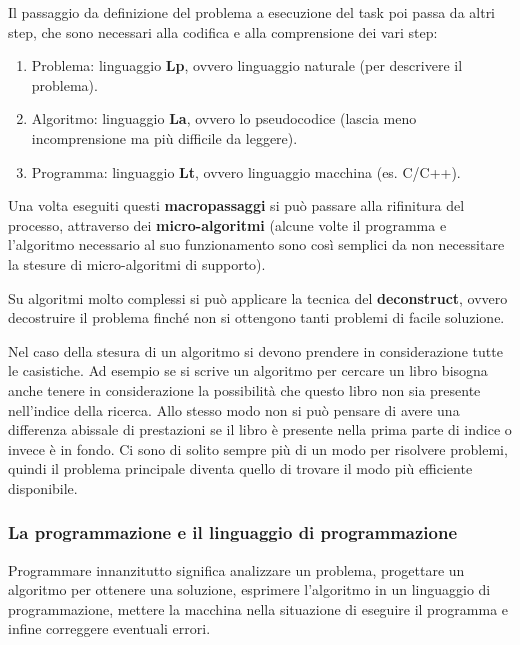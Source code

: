 \documentclass[
  paper=a4,
  oneside  ,captions=tableheading
]{scrbook}
\providecommand{\tightlist}{%
  \setlength{\itemsep}{0pt}\setlength{\parskip}{0pt}}
\begin{document}
Il passaggio da definizione del problema a esecuzione del task poi passa
da altri step, che sono necessari alla codifica e alla comprensione dei
vari step:

\begin{enumerate}
\def\labelenumi{\arabic{enumi}.}
\tightlist
\item
  Problema: linguaggio \textbf{Lp}, ovvero linguaggio naturale (per
  descrivere il problema).
\item
  Algoritmo: linguaggio \textbf{La}, ovvero lo pseudocodice (lascia meno
  incomprensione ma più difficile da leggere).
\item
  Programma: linguaggio \textbf{Lt}, ovvero linguaggio macchina (es.
  C/C++).
\end{enumerate}

Una volta eseguiti questi \textbf{macropassaggi} si può passare alla
rifinitura del processo, attraverso dei \textbf{micro-algoritmi} (alcune
volte il programma e l'algoritmo necessario al suo funzionamento sono
così semplici da non necessitare la stesure di micro-algoritmi di
supporto).

Su algoritmi molto complessi si può applicare la tecnica del
\textbf{deconstruct}, ovvero decostruire il problema finché non si
ottengono tanti problemi di facile soluzione.

Nel caso della stesura di un algoritmo si devono prendere in
considerazione tutte le casistiche. Ad esempio se si scrive un algoritmo
per cercare un libro bisogna anche tenere in considerazione la
possibilità che questo libro non sia presente nell'indice della ricerca.
Allo stesso modo non si può pensare di avere una differenza abissale di
prestazioni se il libro è presente nella prima parte di indice o invece
è in fondo. Ci sono di solito sempre più di un modo per risolvere
problemi, quindi il problema principale diventa quello di trovare il
modo più efficiente disponibile.

\hypertarget{la-programmazione-e-il-linguaggio-di-programmazione}{%
\subsubsection{La programmazione e il linguaggio di
programmazione}\label{la-programmazione-e-il-linguaggio-di-programmazione}}

Programmare innanzitutto significa analizzare un problema, progettare un
algoritmo per ottenere una soluzione, esprimere l'algoritmo in un
linguaggio di programmazione, mettere la macchina nella situazione di
eseguire il programma e infine correggere eventuali errori.
\end{document}
